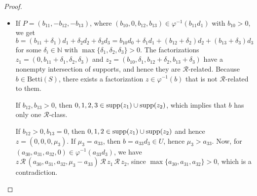 \documentclass[12pt]{article}
\theoremstyle{remark}
\begin{document}
\begin{proof}
\begin{itemize}
    

    
    
   
    Next, suppose that $z = (0,0,\mu_2,0)$. 
    If $\mu_2 = a_{22} $, then $b = a_{22}d_2 \in U$, so $\mu_2 > a_{22}$. We can write
    \begin{equation}\label{betticharacter_eq6}
         b=\mu_2d_2 = a_{20}d_0 + a_{21}d_1 + (\mu_2-a_{22})d_2 + a_{23}d_3.
    \end{equation}
    where $(a_{20},a_{21},0,a_{23}) \in \varphi^{-1}(a_{22}d_2)$.
    Because $(\mu_2-a_{22}) > 0$, we have $z \, \mathcal{R} \, (a_{20},a_{21},\mu_2-a_{22},a_{23})$. Since $z$ is not $\mathcal{R}$-related to $z_1$, we have $a_{20} = a_{21} = 0$ (recall $a_{00},\delta_1 >0$). This gives the factorization $(0,0,\mu_2-a_{22},a_{23}) \in \varphi^{-1}(b)$ that has $(\mu_2-a_{22}),a_{23} > 0$ and which is not $\mathcal{R}$-related to $z_1$ nor $z_2$, as it is $\mathcal{R}$-related to $z$. Thus we reduce to the previously treated case $z =(0,0,\mu_2,\mu_3)$. 

    The case $z = (0,0,0,\mu_3)$ follows analogously. 
    

    \item   If $P =(b_{11},-b_{12},-b_{13})$, where $(b_{10},0,b_{12},b_{13}) \in \varphi^{-1}(b_{11}d_1)$ with $b_{10}>0$, we get
    \begin{equation}
        b = (b_{11}+\delta_1)d_1 +   \delta_2d_2 + \delta_3d_3  =  b_{10}d_0 + \delta_1d_1+ (b_{12}+\delta_2)d_2 + (b_{13}+\delta_3)d_3
    \end{equation}
    for some $\delta_i \in \mathbb{N}$ with $\max \{\delta_1,\delta_2,\delta_3\} > 0$. The factorizations $z_1 =(0,b_{11} +\delta_1,\delta_2,\delta_3)$ and $z_2 =(b_{10},\delta_1,b_{12}+\delta_2,b_{13}+\delta_3)$ have a nonempty intersection of supports, and hence they are $\mathcal{R}$-related. Because $b \in \text{Betti}(S)$, there exists a factorization $z \in \varphi^{-1}(b)$ that is not $\mathcal{R}$-related to them. 
        
        If $b_{12},b_{13}>0$, then $0,1,2,3 \in \textup{supp}(z_1) \cup \textup{supp}(z_2)$, which implies that $b$ has only one $\mathcal{R}$-class.
        
        If $b_{12}>0,b_{13} = 0$, then $0,1,2 \in \textup{supp}(z_1) \cup \textup{supp}(z_2)$ and hence $z = (0,0,0,\mu_3)$. 
        If $\mu_3 = a_{33}$, then $b = a_{33}d_3 \in U$, hence $\mu_3 > a_{33}$. Now, for $(a_{30},a_{31},a_{32},0) \in \varphi^{-1}(a_{33}d_3)$, we have $z \, \mathcal{R} \, (a_{30},a_{31},a_{32},\mu_3-a_{33}) \, \mathcal{R} \, z_1  \, \mathcal{R} \, z_2$, since $\max\{a_{30},a_{31},a_{32}\}>0$, which is a contradiction.


\end{itemize}
\end{proof}
\end{document}
